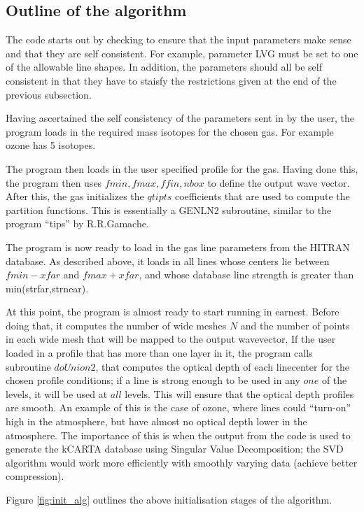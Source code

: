 \documentclass[11pt]{article}
\begin{document}
\subsection{Outline of the algorithm}

The code starts out by checking to ensure that the input parameters make 
sense and that they are self consistent. For example, parameter LVG must 
be set to
one of the allowable line shapes. In addition, the parameters should all be 
self consistent in that they have to staisfy the restrictions given at the 
end of the previous subsection.

Having ascertained the self consistency of the parameters sent in by the 
user, the program loads in the required mass isotopes for the chosen 
gas. For example ozone has 5 isotopes. 

The program then loads in the user specified profile for the gas.
Having done this, the program then uses $fmin,fmax,ffin,nbox$ to define the 
output wave vector. After this, the gas initializes the $qtipts$ 
coefficients that are used to compute the partition functions. This is 
essentially a GENLN2 subroutine, similar to the program ``tips'' by 
R.R.Gamache.

The program is now ready to load in the gas line parameters from the HITRAN
database. As described above, it loads in all lines whose centers lie 
between $fmin - xfar$ and $fmax + xfar$, and whose database line strength 
is greater than min(strfar,strnear). 

At this point, the program is almost ready to start running in earnest. 
Before doing that, it computes the number of wide meshes $N$ and the number 
of points in each wide mesh that will be mapped to the output wavevector.
If the user loaded in a profile that has more than one layer in it, 
the program calls subroutine $doUnion2$, that
computes the optical depth of each linecenter for the chosen profile 
conditions; if a line is strong enough to be used in any $one$ of the 
levels, it will be used at $all$ levels. This will ensure that the optical 
depth profiles are smooth. An example of this is the case of ozone, where 
lines could ``turn-on'' high in the atmosphere, but have almost no optical 
depth lower in the atmosphere. The importance of this is when the output 
from the code is used to generate the kCARTA database using Singular Value 
Decomposition; the SVD algorithm would work more efficiently with smoothly 
varying data (achieve better compression).

Figure \ref{fig:init_alg} outlines the above initialisation stages of the 
algorithm.
\end{document}

